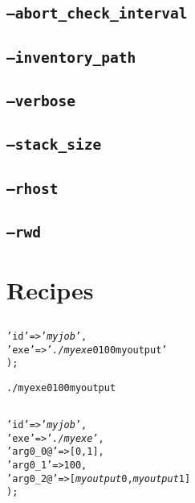 \documentclass[a4paper,10pt]{report}
\begin{document}
\section{\texttt{--abort\_check\_interval}}
\section{\texttt{--inventory\_path}}
\section{\texttt{--verbose}}
\section{\texttt{--stack\_size}}
\section{\texttt{--rhost}}
\section{\texttt{--rwd}}


\appendix
\chapter{Recipes}

\section{}

\begin{boxnote}
\begin{alltt}
%myjob = (
    'id' => '\textit{myjob}',
    'exe' => '\textit{./myexe} 0 100 myoutput'
);
\end{alltt}
\end{boxnote}

\begin{boxnote}
\begin{alltt}
./myexe 0 100 myoutput
\end{alltt}
\end{boxnote}

\section{}

\begin{boxnote}
\begin{alltt}
%myjob = (
    'id' => '\textit{myjob}',
    'exe' => '\textit{./myexe}',
    'arg0_0@' => [0,1],
    'arg0_1' => 100,
    'arg0_2@' => [\textit{myoutput}0,\textit{myoutput}1]
);
\end{alltt}
\end{boxnote}
\end{document}
